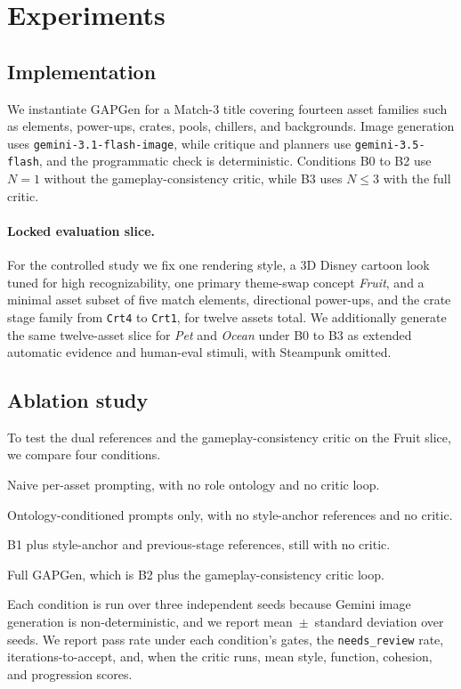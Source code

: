 \documentclass{article}
\begin{document}
\section{Experiments}
\label{sec:experiments}

\subsection{Implementation}
\label{sec:impl}

We instantiate GAPGen for a Match-3 title covering fourteen asset families such as elements,
power-ups, crates, pools, chillers, and backgrounds.
Image generation uses \texttt{gemini-3.1-flash-image}, while critique and planners use
\texttt{gemini-3.5-flash}, and the programmatic check is deterministic.
Conditions B0 to B2 use \(N{=}1\) without the gameplay-consistency critic, while B3 uses
\(N{\le}3\) with the full critic.

\paragraph{Locked evaluation slice.}
For the controlled study we fix one rendering style, a 3D Disney cartoon look tuned for high
recognizability, one primary theme-swap concept \emph{Fruit}, and a minimal asset subset of five
match elements, directional power-ups, and the crate stage family from \texttt{Crt4} to
\texttt{Crt1}, for twelve assets total.
We additionally generate the same twelve-asset slice for \emph{Pet} and \emph{Ocean} under B0 to
B3 as extended automatic evidence and human-eval stimuli, with Steampunk omitted.

\subsection{Ablation study}
\label{sec:ablations}

To test the dual references and the gameplay-consistency critic on the Fruit slice, we
compare four conditions.
\begin{description}[leftmargin=*,itemsep=1pt]
  \item[B0] Naive per-asset prompting, with no role ontology and no critic loop.
  \item[B1] Ontology-conditioned prompts only, with no style-anchor references and no critic.
  \item[B2] B1 plus style-anchor and previous-stage references, still with no critic.
  \item[B3] Full GAPGen, which is B2 plus the gameplay-consistency critic loop.
\end{description}
Each condition is run over three independent seeds because Gemini image generation is
non-deterministic, and we report mean~$\pm$~standard deviation over seeds.
We report pass rate under each condition's gates, the \texttt{needs\_review} rate,
iterations-to-accept, and, when the critic runs, mean style, function, cohesion, and progression
scores.
\end{document}
